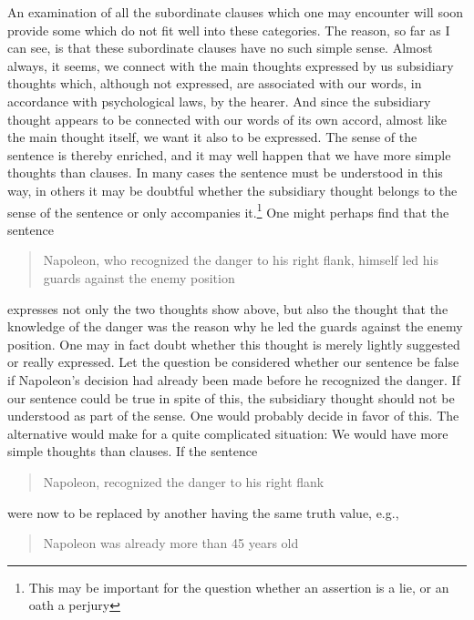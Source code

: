\documentclass[twoside,12pt,a4paper]{article}
\begin{document}
An examination of all the subordinate clauses which one may encounter
will soon provide some which do not fit well into these categories.
The reason, so far as I can see, is that these subordinate clauses
have no such simple sense. Almost always, it seems, we connect with
the main thoughts expressed by us subsidiary thoughts which, although
not expressed, are associated with our words, in accordance with
psychological laws, by the hearer. And since the subsidiary thought
appears to be connected with our words of its own accord, almost like
the main thought itself, we want it also to be expressed. The sense of
the sentence is thereby enriched, and it may well happen that we have
more simple thoughts than clauses. In many cases the sentence must be
understood in this way, in others it may be doubtful whether the
subsidiary thought belongs to the sense of the sentence or only
accompanies it.\footnote[14]{This may be important for the question
  whether an assertion is a lie, or an oath a perjury} One might
perhaps find that the sentence

\begin{quote}
  Napoleon, who recognized the danger to his right flank, himself led
  his guards against the enemy position
\end{quote}

\noindent expresses not only the two thoughts show above, but also the
thought that the knowledge of the danger was the reason why he led the
guards against the enemy position. One may in fact doubt whether this
thought is merely lightly suggested or really expressed. Let the
question be considered whether our sentence be false if Napoleon's
decision had already been made before he recognized the danger. If our
sentence could be true in spite of this, the subsidiary thought should
not be understood as part of the sense. One would probably decide in
favor of this. The alternative would make for a quite complicated
situation: We would have more simple thoughts than clauses. If the
sentence

\begin{quote}
  Napoleon, recognized the danger to his right flank
\end{quote}

\noindent were now to be replaced by another having the same truth
value, e.g.,

\begin{quote}
  Napoleon was already more than 45 years old
\end{quote}
\end{document}

